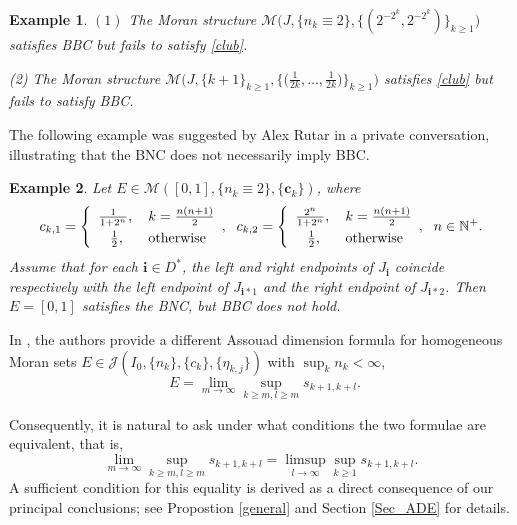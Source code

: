 \documentclass[12pt]{amsart}
\numberwithin{equation}{section}
\theoremstyle{plain}
\newtheorem{theorem}{Theorem}[section]
\newtheorem{example}{Example}[section]
\theoremstyle{remark}
\theoremstyle{definition}
\newcommand{\N}{\mathbb{N}}
\newcommand{\iii}{\mathbf{i}}
\newcommand{\ccc}{\mathbf{c}}
\newcommand{\f}{\frac}
\renewcommand{\ge}{\geqslant}
\DeclareMathOperator{\dima}{dim_A}
\begin{document}
	\begin{example}\label{1-2-3+}
		 $(1)$  The Moran structure $ \mathcal{M}\big(J,\{n_k\equiv 2\},\big\{(2^{-2^k},2^{-2^k})\big\}_{k\ge 1}\big)$ satisfies BBC but fails to satisfy \eqref{club}.\vspace{0.2em}
		
\noindent		(2)  The Moran structure $\mathcal{M}\big(J,\{k+1\}_{k\ge 1},\big\{\big(\f1{2k},\ldots,\f1{2k}\big)\big\}_{k\ge 1}\big)$ satisfies \eqref{club} but fails to satisfy BBC.
	\end{example}	
	The following example was suggested by Alex Rutar in a private conversation,  illustrating  that the BNC does not necessarily imply BBC.
	\begin{example}\label{BCandBNC}
		Let $E\in \mathcal{M}([0,1],\{n_k\equiv 2\},\{\ccc_{k}\})$, where
		\[
		c_{k,1}=\left\{\begin{array}{cl}
			\f 1{1+2^n},\, & k=\f{n(n+1)}2 \vspace{0.3em}\\
			\f12, & \text{otherwise}\\
		\end{array},
		\right.\ c_{k,2}=\left\{\begin{array}{cl}
			\f {2^n}{1+2^n},\, & k=\f{n(n+1)}2 \vspace{0.3em}\\
			\f12, & \text{otherwise}\\
		\end{array},
		\right.\ n\in\N^+.
		\]
Assume that for each $\iii\in D^*$, the left and right endpoints of 
		$J_\iii$ coincide  respectively  with the left endpoint of
		$J_{\iii*1}$ and the right endpoint of $J_{\iii*2}$.	Then $E=[0,1]$ satisfies the BNC, but BBC does not hold.
	\end{example}
	
	

	
	In \cite{PENG2017192,yang2020assouad}, the authors  provide a different Assouad dimension   formula for homogeneous Moran  sets $E\in \mathcal{J}(I_0,\{n_k\},\{c_k\},\{\eta_{k,j}\})$ with $\sup_k n_k<\infty$, 
	\[
	\dima E=\lim_{m\to\infty}\sup_{k\ge m,l\ge m} s_{k+1,k+l}.
	\]

	Consequently, it is natural to ask under what conditions the two formulae are equivalent, that is, 
	\[
	\lim_{m\to\infty}\sup_{k\ge m,l\ge m} s_{k+1,k+l}=\limsup_{l\to\infty}\sup_{k\ge 1} s_{k+1,k+l}.
	\]
A sufficient condition for this equality is derived as a direct consequence of our principal conclusions; see Propostion \ref{general} and  Section \ref{Sec_ADE} for details.
	
\end{document}
